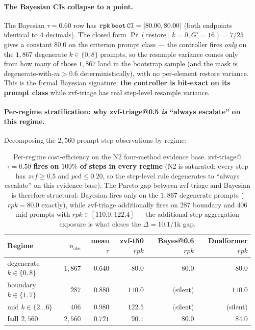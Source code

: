 \paragraph{The Bayesian CIs collapse to a point.}
The Bayesian $\tau{=}0.60$ row has $\texttt{rpk\,boot\,CI} = [80.00, 80.00]$
(both endpoints identical to $4$ decimals). The closed form
$\Pr(\mathrm{restore} \mid k{=}0, G'{=}16) = 7/25$ gives a constant
$80.0$ on the criterion prompt class --- the controller fires
\emph{only} on the $1{,}867$ degenerate $k \in \{0,8\}$ prompts,
so the resample variance comes only from how many of those
$1{,}867$ land in the bootstrap sample (and the mask is
degenerate-with-$m{>}0.6$ deterministically), with no per-element
restore variance. This is the formal Bayesian signature: \textbf{the
controller is bit-exact on its prompt class} while zvf-triage has
real step-level resample variance.

\paragraph{Per-regime stratification: why zvf-triage@0.5
\textit{is} ``always escalate'' on this regime.}
Decomposing the $2{,}560$ prompt-step observations by regime:

\begin{table}[t]
\centering
\caption{Per-regime cost-efficiency on the N2 four-method evidence
base. zvf-triage@$\tau{=}0.50$ \textbf{fires on $100\%$ of steps in
every regime} (N2 is saturated: every step has $zvf \geq 0.5$ and
$pcd \leq 0.20$, so the step-level rule degenerates to ``always
escalate'' on this evidence base). The Pareto gap between
zvf-triage and Bayesian is therefore structural: Bayesian fires
only on the $1{,}867$ degenerate prompts ($rpk{=}80.0$ exactly),
while zvf-triage additionally fires on $287$ boundary and $406$
mid prompts with $rpk \in [110.0, 122.4]$ --- the additional
step-aggregation exposure is what closes the $\Delta{=}10.1$/1k gap.}
\label{tab:p7-controller-regime}
\begin{tabular}{lrrrrr}
\toprule
Regime & $n_{\mathrm{obs}}$ & mean $r$ & zvf-t50 $rpk$ & Bayes@0.6 $rpk$ & Dualformer $rpk$ \\
\midrule
degenerate $k{\in}\{0,8\}$  & $1{,}867$ & $0.640$ & $80.0$ & $80.0$ & $80.0$ \\
boundary $k{\in}\{1,7\}$   & $287$ & $0.880$ & $110.0$ & (silent) & $110.0$ \\
mid $k{\in}\{2{\ldots}6\}$  & $406$ & $0.980$ & $122.5$ & (silent) & (silent) \\
\midrule
\textbf{full $2{,}560$} & $2{,}560$ & $0.721$ & $\mathbf{90.1}$ & $80.0$ & $84.0$ \\
\bottomrule
\end{tabular}
\end{table}

